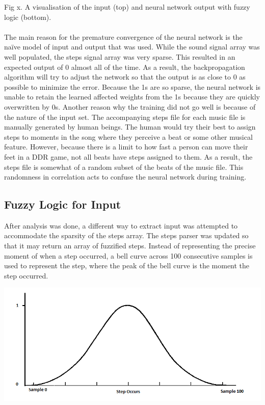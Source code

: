 Fig x. A visualisation of the input (top) and neural network output with fuzzy logic (bottom).
\\\\
The main reason for the premature convergence of the neural network is the naïve model of input and output that was used. While the sound signal array was well populated, the steps signal array was very sparse. This resulted in an expected output of 0 almost all of the time. As a result, the backpropagation algorithm will try to adjust the network so that the output is as close to 0 as possible to minimize the error. Because the 1s are so sparse, the neural network is unable to retain the learned affected weights from the 1s because they are quickly overwritten by 0s.
Another reason why the training did not go well is because of the nature of the input set. The accompanying steps file for each music file is manually generated by human beings. The human would try their best to assign steps to moments in the song where they perceive a beat or some other musical feature. However, because there is a limit to how fast a person can move their feet in a DDR game, not all beats have steps assigned to them. As a result, the steps file is somewhat of a random subset of the beats of the music file. This randomness in correlation acts to confuse the neural network during training.

\subsection{Fuzzy Logic for Input}

After analysis was done, a different way to extract input was attempted to accommodate the sparsity of the steps array. The steps parser was updated so that it may return an array of fuzzified steps. Instead of representing the precise moment of when a step occurred, a bell curve across 100 consecutive samples is used to represent the step, where the peak of the bell curve is the moment the step occurred.

\includegraphics[scale=0.3]{fuzzy.png}

